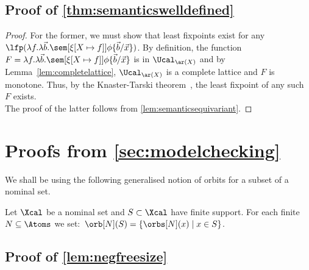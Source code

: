 \subsection{Proof of \cref{thm:semanticswelldefined}}
\semanticswelldefined*
\begin{proof}
For the former, we must show that least fixpoints exist for any $\lfp(\lambda f.\lambda \vec b.\sem[{\xi[X \mapsto f]}]{\phi\{\vec b/\vec x\}})$. 
By definition, the function $F = \lambda f.\lambda \vec b.\sem[{\xi[X \mapsto f]}]{\phi\{\vec b/\vec x\}}$ is in $\Ucal_{\ar(X)}$ and by Lemma~\ref{lem:completelattice}, $\Ucal_{\ar(X)}$ is a complete lattice and $F$ is monotone. 
Thus, by the Knaster-Tarski theorem~\cite{Tarski}, the least fixpoint of any such $F$ exists.
\\
The proof of the latter follows from \cref{lem:semanticsequivariant}.
\end{proof}

\section{Proofs from \cref{sec:modelchecking}}
We shall be using the following generalised notion of orbits for a subset of a nominal set.

\begin{definition}
  Let $\Xcal$ be a nominal set and $S\subset\Xcal$ have finite support. For each finite $N\subseteq\Atoms$ we set:\
$
\orb[N](S) = \{ \orbs[N](x)\mid x\in S\} 
$.
\end{definition}

\subsection{Proof of \cref{lem:negfreesize}}
\negfreesize*

